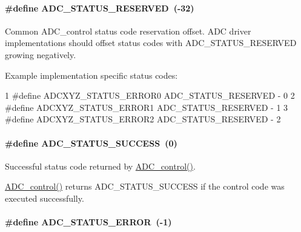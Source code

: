 \paragraph[{A\+D\+C\+\_\+\+S\+T\+A\+T\+U\+S\+\_\+\+R\+E\+S\+E\+R\+V\+E\+D}]{\setlength{\rightskip}{0pt plus 5cm}\#define A\+D\+C\+\_\+\+S\+T\+A\+T\+U\+S\+\_\+\+R\+E\+S\+E\+R\+V\+E\+D~(-\/32)}\label{_a_d_c_8h_a5a8bd7786df22349b1a5434f48b08581}
Common A\+D\+C\+\_\+control status code reservation offset. A\+D\+C driver implementations should offset status codes with A\+D\+C\+\_\+\+S\+T\+A\+T\+U\+S\+\_\+\+R\+E\+S\+E\+R\+V\+E\+D growing negatively.

Example implementation specific status codes\+: 
\begin{DoxyCode}
1 #define ADCXYZ\_STATUS\_ERROR0     ADC\_STATUS\_RESERVED - 0
2 #define ADCXYZ\_STATUS\_ERROR1     ADC\_STATUS\_RESERVED - 1
3 #define ADCXYZ\_STATUS\_ERROR2     ADC\_STATUS\_RESERVED - 2
\end{DoxyCode}
\paragraph[{A\+D\+C\+\_\+\+S\+T\+A\+T\+U\+S\+\_\+\+S\+U\+C\+C\+E\+S\+S}]{\setlength{\rightskip}{0pt plus 5cm}\#define A\+D\+C\+\_\+\+S\+T\+A\+T\+U\+S\+\_\+\+S\+U\+C\+C\+E\+S\+S~(0)}\label{_a_d_c_8h_aee02c8883a7e443d36ea47f9696730ec}


Successful status code returned by \hyperlink{_a_d_c_8h_af4be7e5e4f5cc931f4501a542d689c32}{A\+D\+C\+\_\+control()}. 

\hyperlink{_a_d_c_8h_af4be7e5e4f5cc931f4501a542d689c32}{A\+D\+C\+\_\+control()} returns A\+D\+C\+\_\+\+S\+T\+A\+T\+U\+S\+\_\+\+S\+U\+C\+C\+E\+S\+S if the control code was executed successfully. 
\paragraph[{A\+D\+C\+\_\+\+S\+T\+A\+T\+U\+S\+\_\+\+E\+R\+R\+O\+R}]{\setlength{\rightskip}{0pt plus 5cm}\#define A\+D\+C\+\_\+\+S\+T\+A\+T\+U\+S\+\_\+\+E\+R\+R\+O\+R~(-\/1)}\label{_a_d_c_8h_a33ce323c3bbdc8a3f4e018f99a92b09d}


